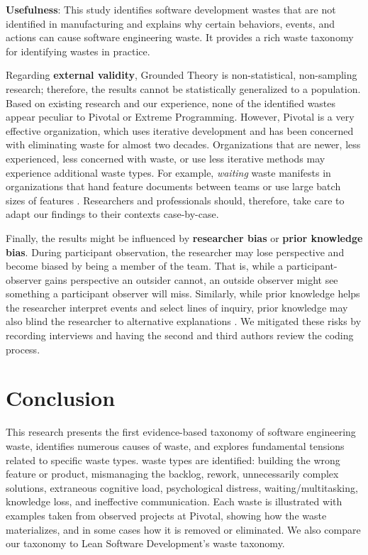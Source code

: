 \textbf{Usefulness}:  This study identifies software development wastes that are not identified in manufacturing and explains why certain behaviors, events, and actions can cause software engineering waste. It provides a rich waste taxonomy for identifying wastes in practice. %

Regarding \textbf{external validity}, Grounded Theory is non-statistical, non-sampling research; therefore, the results cannot be statistically generalized to a population. Based on existing research and our experience, none of the identified wastes appear peculiar to Pivotal or Extreme Programming. However, Pivotal is a very effective organization, which uses iterative development and has been concerned with eliminating waste for almost two decades. Organizations that are newer, less experienced, less concerned with waste, or use less iterative methods may experience additional waste types. For example, \textit{waiting} waste manifests in organizations that hand feature documents between teams or use large batch sizes of features \cite{Ali2016, Khurum2014, Mujtaba2010}. Researchers and professionals should, therefore, take care to adapt our findings to their contexts case-by-case. 

Finally, the results might be influenced by \textbf{researcher bias} or \textbf{prior knowledge bias}. During participant observation, the researcher may lose perspective and become biased by being a member of the team. That is, while a participant-observer gains perspective an outsider cannot, an outside observer might see something a participant observer will miss. Similarly, while prior knowledge helps the researcher interpret events and select lines of inquiry, prior knowledge may also blind the researcher to alternative explanations \cite{GlaserIssues}. We mitigated these risks by recording interviews and having the second and third authors review the coding process.

\section{Conclusion}
\label{Conclusion}
This research presents the first evidence-based taxonomy of software engineering waste, identifies numerous causes of waste, and explores fundamental tensions related to specific waste types. \numberOfWastesCapitalized{} waste types are identified: building the wrong feature or product, mismanaging the backlog, rework, unnecessarily complex solutions, extraneous cognitive load, 
psychological distress, waiting/multitasking, knowledge loss, and ineffective communication. Each waste is illustrated with examples taken from observed projects at Pivotal, showing how the waste materializes, and in some cases how it is removed or eliminated. We also compare our taxonomy to Lean Software Development's waste taxonomy.

